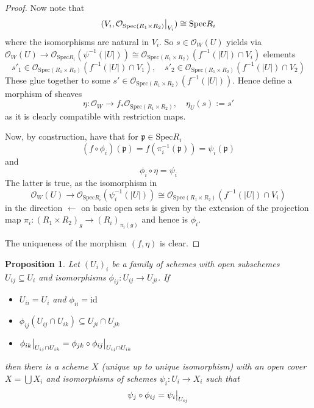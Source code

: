 \documentclass{scrartcl}
\newcommand{\p}{\mathfrak{p}}
\newcommand{\Spec}{\mathrm{Spec}}
\renewcommand{\O}{\mathcal{O}}
\newcommand\restr[2]{{
    \left.\kern-\nulldelimiterspace
    #1
    \vphantom{\big|}
    \right|_{#2}
}}
\newtheorem{prop}{Proposition}[section]
\theoremstyle{definition}
\begin{document}
\begin{proof}
    Now note that
    \begin{equation*}
        (V_i, \restr{\O_{\Spec(R_1 \times R_2)}}{V_i}) \cong \Spec R_i
    \end{equation*}
    where the isomorphisms are natural in $V_i$.
    So $s \in \O_W(U)$ yields via $\O_W(U) \to \O_{\Spec R_i}(\psi^{-1}(|U|)) \cong \O_{\Spec(R_1 \times R_2)}(f^{-1}(|U|) \cap V_i)$ elements
    \begin{equation*}
        s'_1 \in \O_{\Spec(R_1 \times R_2)}(f^{-1}(|U|) \cap V_1), \quad s'_2 \in \O_{\Spec(R_1 \times R_2)}(f^{-1}(|U|) \cap V_2)
    \end{equation*}
    These glue together to some $s' \in \O_{\Spec(R_1 \times R_2)}(f^{-1}(|U|))$.
    Hence define a morphism of sheaves
    \begin{equation*}
        \eta: \O_W \to f_*\O_{\Spec(R_1 \times R_2)}, \quad \eta_U(s) := s'
    \end{equation*}
    as it is clearly compatible with restriction maps.

    Now, by construction, have that for $\p \in \Spec R_i$
    \begin{equation*}
        (f \circ \phi_i)(\p) = f(\pi_i^{-1}(\p)) = \psi_i(\p)
    \end{equation*}
    and
    \begin{equation*}
        \phi_i \circ \eta = \psi_i
    \end{equation*}
    The latter is true, as the isomorphism in
    \begin{equation*}
        \O_W(U) \to \O_{\Spec R_i}(\psi_i^{-1}(|U|)) \cong \O_{\Spec(R_1 \times R_2)}(f^{-1}(|U|) \cap V_i)
    \end{equation*}
    in the direction $\leftarrow$ on basic open sets is given by the extension of the projection map $\pi_i: (R_1 \times R_2)_g \to (R_i)_{\pi_i(g)}$ and hence is $\phi_i$.

    The uniqueness of the morphism $(f, \eta)$ is clear.
\end{proof}
\begin{prop}
    Let $(U_i)_i$ be a family of schemes with open subschemes $U_{ij} \subseteq U_i$ and isomorphisms $\phi_{ij}: U_{ij} \to U_{ji}$.
    If
    \begin{itemize}
        \item $U_{ii} = U_i$ and $\phi_{ii} = \mathrm{id}$
        \item $\phi_{ij}(U_{ij} \cap U_{ik}) \subseteq U_{ji} \cap U_{jk}$
        \item $\restr{\phi_{ik}}{U_{ij} \cap U_{ik}} = \phi_{jk} \circ \restr{\phi_{ij}}{U_{ij} \cap U_{ik}}$
    \end{itemize}
    then there is a scheme $X$ (unique up to unique isomorphism) with an open cover $X = \bigcup X_i$ and isomorphisms of schemes $\psi_i: U_i \to X_i$ such that
    \begin{equation*}
        \psi_j \circ \phi_{ij} = \restr{\psi_i}{U_{ij}}
    \end{equation*}
\end{prop}
\end{document}
